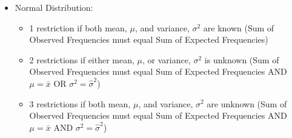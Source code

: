 \begin{note}
\begin{itemize}
\begin{itemize}
	\end{itemize} 
	\item Normal Distribution:
	\begin{itemize}
		\item 1 restriction if both mean, $\mu$, and variance, $\sigma^2$ are known (Sum of Observed Frequencies must equal Sum of Expected Frequencies)
		\item 2 restrictions if either mean, $\mu$, or variance, $\sigma^2$ is unknown (Sum of Observed Frequencies must equal Sum of Expected Frequencies AND $\mu=\bar{x}$ OR $\sigma^2=\hat{\sigma}^2$)
		\item 3 restrictions if both mean, $\mu$, and variance, $\sigma^2$ are unknown (Sum of Observed Frequencies must equal Sum of Expected Frequencies AND $\mu=\bar{x}$ AND $\sigma^2=\hat{\sigma}^2$)
	\end{itemize} 
\end{itemize} 

\end{note}







